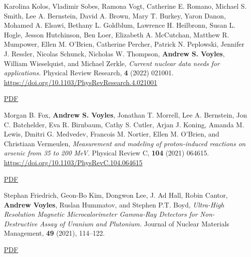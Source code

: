 \begin{bibsection}
\item Karolina Kolos,  Vladimir Sobes,  Ramona Vogt, Catherine E. Romano,  Michael S. Smith,  Lee A. Bernstein, David A. Brown,  Mary T. Burkey,  Yaron Danon,  Mohamed A. Elsawi,  Bethany L. Goldblum, Lawrence H. Heilbronn,  Susan L. Hogle,  Jesson Hutchinson,  Ben Loer,  Elizabeth A. McCutchan, Matthew R. Mumpower,  Ellen M. O’Brien,  Catherine Percher,  Patrick N. Peplowski,  Jennifer J. Ressler, Nicolas Schunck,  Nicholas W. Thompson,  \textbf{Andrew S. Voyles},  William Wieselquist,  and Michael Zerkle, \emph{Current nuclear data needs for applications.} Physical Review Research, \textbf{4} (2022) 021001. \url{https://doi.org/10.1103/PhysRevResearch.4.021001} 

\ifshort \vspace{0.1cm} \href{https://avoyles.github.io/papers/Kolos2022_WANDA.pdf}{\underline{PDF}} \else  \fi 



\item Morgan B. Fox,  \textbf{Andrew S. Voyles}, Jonathan T. Morrell,  Lee A. Bernstein, Jon C. Batchelder, Eva R. Birnbaum,  Cathy S. Cutler,  Arjan J. Koning,  Amanda M. Lewis,  Dmitri G. Medvedev, Francois M. Nortier,  Ellen M. O’Brien,  and Christiaan Vermeulen, \emph{Measurement and modeling of proton-induced reactions on arsenic from 35 to 200 MeV.} Physical Review C, \textbf{104} (2021) 064615. \url{https://doi.org/10.1103/PhysRevC.104.064615} 

\ifshort \vspace{0.1cm} \href{https://avoyles.github.io/papers/Fox2021_As.pdf}{\underline{PDF}} \else  \fi 


\item Stephan Friedrich, Geon-Bo Kim, Dongwon Lee, J. Ad Hall, Robin Cantor, \textbf{Andrew Voyles}, Ruslan Hummatov, and Stephen P.T. Boyd, \emph{Ultra-High Resolution Magnetic Microcalorimeter Gamma-Ray Detectors for Non-Destructive Assay of Uranium and Plutonium.} Journal of Nuclear Materials Management, \textbf{49} (2021), 114--122. 

\ifshort \vspace{0.1cm} \href{https://avoyles.github.io/papers/Friedrich2021_MMC.pdf}{\underline{PDF}} \else  \fi 









\end{bibsection}
